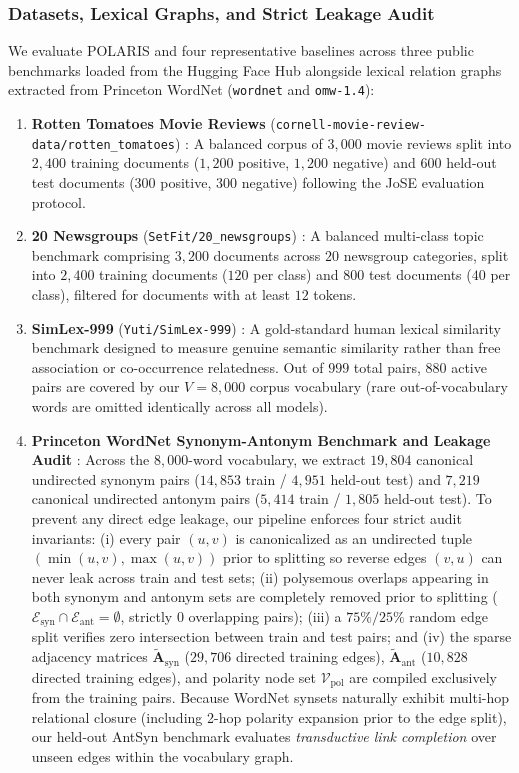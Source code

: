 \documentclass[journal]{IEEEtran}
\begin{document}
\subsubsection{Datasets, Lexical Graphs, and Strict Leakage Audit}
We evaluate POLARIS and four representative baselines across three public benchmarks loaded from the Hugging Face Hub alongside lexical relation graphs extracted from Princeton WordNet (\texttt{wordnet} and \texttt{omw-1.4}):
\begin{enumerate}
    \item \textbf{Rotten Tomatoes Movie Reviews} (\texttt{cornell-movie-review-data/rotten\_tomatoes}) \cite{pang2005seeing}: A balanced corpus of $3,000$ movie reviews split into $2,400$ training documents ($1,200$ positive, $1,200$ negative) and $600$ held-out test documents ($300$ positive, $300$ negative) following the JoSE evaluation protocol.
    \item \textbf{20 Newsgroups} (\texttt{SetFit/20\_newsgroups}) \cite{lang1995newsweeder}: A balanced multi-class topic benchmark comprising $3,200$ documents across $20$ newsgroup categories, split into $2,400$ training documents ($120$ per class) and $800$ test documents ($40$ per class), filtered for documents with at least $12$ tokens.
    \item \textbf{SimLex-999} (\texttt{Yuti/SimLex-999}) \cite{hill2015simlex}: A gold-standard human lexical similarity benchmark designed to measure genuine semantic similarity rather than free association or co-occurrence relatedness. Out of $999$ total pairs, $880$ active pairs are covered by our $V = 8,000$ corpus vocabulary (rare out-of-vocabulary words are omitted identically across all models).
    \item \textbf{Princeton WordNet Synonym-Antonym Benchmark and Leakage Audit} \cite{miller1995wordnet}: Across the $8,000$-word vocabulary, we extract $19,804$ canonical undirected synonym pairs ($14,853$ train / $4,951$ held-out test) and $7,219$ canonical undirected antonym pairs ($5,414$ train / $1,805$ held-out test). To prevent any direct edge leakage, our pipeline enforces four strict audit invariants: (i) every pair $(u, v)$ is canonicalized as an undirected tuple $(\min(u, v), \max(u, v))$ prior to splitting so reverse edges $(v, u)$ can never leak across train and test sets; (ii) polysemous overlaps appearing in both synonym and antonym sets are completely removed prior to splitting ($\mathcal{E}_{\text{syn}} \cap \mathcal{E}_{\text{ant}} = \emptyset$, strictly $0$ overlapping pairs); (iii) a $75\% / 25\%$ random edge split verifies zero intersection between train and test pairs; and (iv) the sparse adjacency matrices $\tilde{\mathbf{A}}_{\text{syn}}$ ($29,706$ directed training edges), $\tilde{\mathbf{A}}_{\text{ant}}$ ($10,828$ directed training edges), and polarity node set $\mathcal{V}_{\text{pol}}$ are compiled exclusively from the training pairs. Because WordNet synsets naturally exhibit multi-hop relational closure (including 2-hop polarity expansion prior to the edge split), our held-out AntSyn benchmark evaluates \textit{transductive link completion} over unseen edges within the vocabulary graph.
\end{enumerate}
\end{document}
